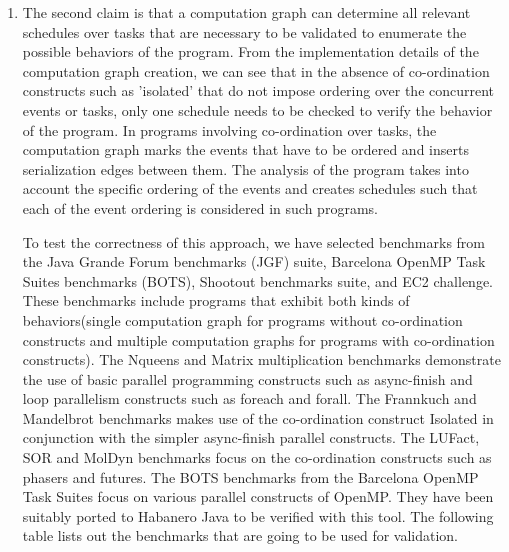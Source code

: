 \begin{enumerate}
\item The second claim is that a computation graph can determine all relevant schedules over tasks that are necessary to be validated to enumerate the possible behaviors of the program. From the implementation details of the computation graph creation, we can see that in the absence of co-ordination constructs such as 'isolated' that do not impose ordering over the concurrent events or tasks, only one schedule needs to be checked to verify the behavior of the program. In programs involving co-ordination over tasks, the computation graph marks the events that have to be ordered and inserts serialization edges between them. The analysis of the program takes into account the specific ordering of the events and creates schedules such that each of the event ordering is considered in such programs.

To test the correctness of this approach, we have selected benchmarks from the Java Grande Forum benchmarks (JGF) suite, Barcelona OpenMP Task Suites benchmarks (BOTS), Shootout benchmarks suite, and EC2 challenge. These benchmarks include programs that exhibit both kinds of behaviors(single computation graph for programs without co-ordination constructs and multiple computation graphs for programs with co-ordination constructs). The Nqueens and Matrix multiplication benchmarks demonstrate the use of basic parallel programming constructs such as async-finish and loop parallelism constructs such as foreach and forall. The Frannkuch and Mandelbrot benchmarks makes use of the co-ordination construct Isolated in conjunction with the simpler async-finish parallel constructs. The LUFact, SOR and MolDyn benchmarks focus on the co-ordination constructs such as phasers and futures. The BOTS  benchmarks from the Barcelona OpenMP Task Suites focus on various parallel constructs of OpenMP. They have been suitably ported to Habanero Java  to be verified with this tool. The following table lists out the benchmarks that are going to be used for validation. 


\end{enumerate}
